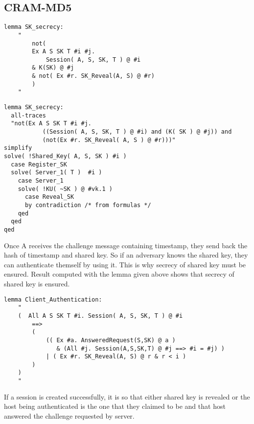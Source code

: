 \documentclass[a4paper, 12pt, titlepage]{article}
\begin{document}
\subsection{CRAM-MD5}
\begin{lstlisting}[caption = Implementation of secrecy lemma of CRAM-MD5 protocol]
lemma SK_secrecy:
	"
		not(
		Ex A S SK T #i #j.
			Session( A, S, SK, T ) @ #i
		& K(SK) @ #j
		& not( Ex #r. SK_Reveal(A, S) @ #r)
		)
	"
\end{lstlisting}
\begin{lstlisting}[caption = Execution results are positive for secrecy lemma of CRAM-MD5 protocol]
lemma SK_secrecy:
  all-traces
  "not(Ex A S SK T #i #j.
           ((Session( A, S, SK, T ) @ #i) and (K( SK ) @ #j)) and
           (not(Ex #r. SK_Reveal( A, S ) @ #r)))"
simplify
solve( !Shared_Key( A, S, SK ) #i )
  case Register_SK
  solve( Server_1( T )  #i )
    case Server_1
    solve( !KU( ~SK ) @ #vk.1 )
      case Reveal_SK
      by contradiction /* from formulas */
    qed
  qed
qed
\end{lstlisting}
Once A receives the challenge message containing timestamp, they send back the hash of timestamp and shared key. So if an adversary knows the shared key, they can authenticate themself by using it. This is why secrecy of shared key must be ensured. Result computed with the lemma given above shows that secrecy of shared key is ensured.
\begin{lstlisting}[caption = Implementation of authentication lemma of CRAM-MD5 protocol]
lemma Client_Authentication:
	"
	(  All A S SK T #i. Session( A, S, SK, T ) @ #i
		==>
		(
			(( Ex #a. AnsweredRequest(S,SK) @ a )
			   & (All #j. Session(A,S,SK,T) @ #j ==> #i = #j) )
			| ( Ex #r. SK_Reveal(A, S) @ r & r < i )
		)
	)
	"
\end{lstlisting}
If a session is created successfully, it is so that either shared key is revealed or the host being authenticated is the one that they claimed to be and that host answered the challenge requested by server.
\end{document}
